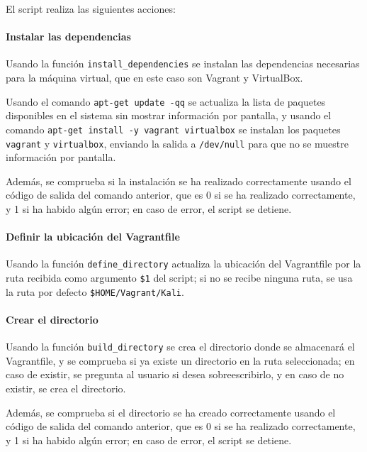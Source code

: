 \begin{appendices}
                El script realiza las siguientes acciones:

                \paragraph{Instalar las dependencias}

                    Usando la función \texttt{install\_dependencies} se instalan las dependencias necesarias para la máquina virtual, que en este caso son Vagrant y VirtualBox.

                    Usando el comando \texttt{apt-get update -qq} se actualiza la lista de paquetes disponibles en el sistema sin mostrar información por pantalla, y usando el comando \texttt{apt-get install -y vagrant virtualbox} se instalan los paquetes \texttt{vagrant} y \texttt{virtualbox}, enviando la salida a \texttt{/dev/null} para que no se muestre información por pantalla.

                    Además, se comprueba si la instalación se ha realizado correctamente usando el código de salida del comando anterior, que es 0 si se ha realizado correctamente, y 1 si ha habido algún error; en caso de error, el script se detiene.

                \paragraph{Definir la ubicación del Vagrantfile}
                
                    Usando la función \texttt{define\_directory} actualiza la ubicación del Vagrantfile por la ruta recibida como argumento \texttt{\$1} del script; si no se recibe ninguna ruta, se usa la ruta por defecto \texttt{\$HOME/Vagrant/Kali}.

                \paragraph{Crear el directorio}

                    Usando la función \texttt{build\_directory} se crea el directorio donde se almacenará el Vagrantfile, y se comprueba si ya existe un directorio en la ruta seleccionada; en caso de existir, se pregunta al usuario si desea sobreescribirlo, y en caso de no existir, se crea el directorio.

                    Además, se comprueba si el directorio se ha creado correctamente usando el código de salida del comando anterior, que es 0 si se ha realizado correctamente, y 1 si ha habido algún error; en caso de error, el script se detiene.


\end{appendices}
